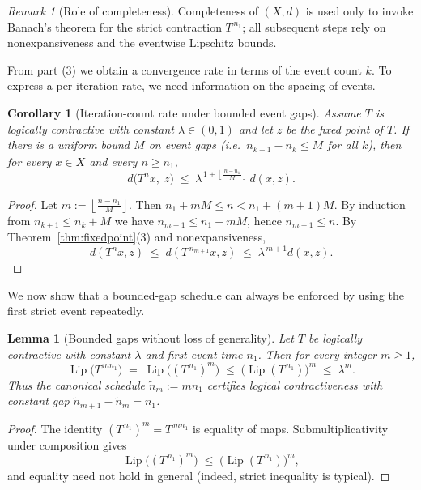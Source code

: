 \documentclass[11pt]{article}
\newtheorem{lemma}[theorem]{Lemma}
\newtheorem{corollary}[theorem]{Corollary}
\theoremstyle{definition}
\theoremstyle{remark}
\newtheorem{remark}[theorem]{Remark}
\DeclareMathOperator{\Lip}{Lip}
\begin{document}
\begin{remark}[Role of completeness]
Completeness of $(X,d)$ is used only to invoke Banach's theorem for the strict contraction $T^{\,n_1}$; all subsequent steps rely on nonexpansiveness and the eventwise Lipschitz bounds.
\end{remark}

From part (3) we obtain a convergence rate in terms of the event count $k$. To express a per-iteration rate, we need information on the spacing of events.

\begin{corollary}[Iteration-count rate under bounded event gaps]\label{cor:rate}
Assume $T$ is logically contractive with constant $\lambda\in(0,1)$ and let $z$ be the fixed point of $T$. If there is a uniform bound $M$ on event gaps (i.e.\ $n_{k+1}-n_k\le M$ for all $k$), then for every $x\in X$ and every $n\ge n_1$,
\[
d\!\big(T^n x,\;z\big) \;\le\; \lambda^{\,1+\left\lfloor \frac{\,n-n_1\,}{M}\right\rfloor} \, d(x,z).
\]
\end{corollary}

\begin{proof}
Let $m:=\left\lfloor \frac{n-n_1}{M}\right\rfloor$. Then $n_1+mM\le n < n_1+(m+1)M$. 
By induction from $n_{k+1}\le n_k+M$ we have $n_{m+1}\le n_1+mM$, hence $n_{m+1}\le n$. 
By Theorem~\ref{thm:fixedpoint}(3) and nonexpansiveness,
\[
d(T^n x,z)\;\le\; d(T^{\,n_{m+1}}x,z)\;\le\; \lambda^{\,m+1} d(x,z).
\]
\end{proof}

We now show that a bounded-gap schedule can always be enforced by using the first strict event repeatedly.

\begin{lemma}[Bounded gaps without loss of generality]\label{lem:bounded-gaps}
Let $T$ be logically contractive with constant $\lambda$ and first event time $n_1$. Then for every integer $m\ge 1$,
\[
\Lip\!\big(T^{\,m n_1}\big)\;=\;\Lip\!\big((T^{\,n_1})^m\big)\;\le\;\big(\Lip(T^{\,n_1})\big)^m \;\le\; \lambda^m.
\]
Thus the \emph{canonical} schedule $\tilde n_m:= m n_1$ certifies logical contractiveness with constant gap $\tilde n_{m+1}-\tilde n_m = n_1$.
\end{lemma}

\begin{proof}
The identity $(T^{\,n_1})^m=T^{\,m n_1}$ is equality of maps. Submultiplicativity under composition gives
\[
\Lip\!\big((T^{\,n_1})^m\big)\;\le\;\big(\Lip(T^{\,n_1})\big)^m,
\]
and equality need not hold in general (indeed, strict inequality is typical).
\end{proof}
\end{document}
